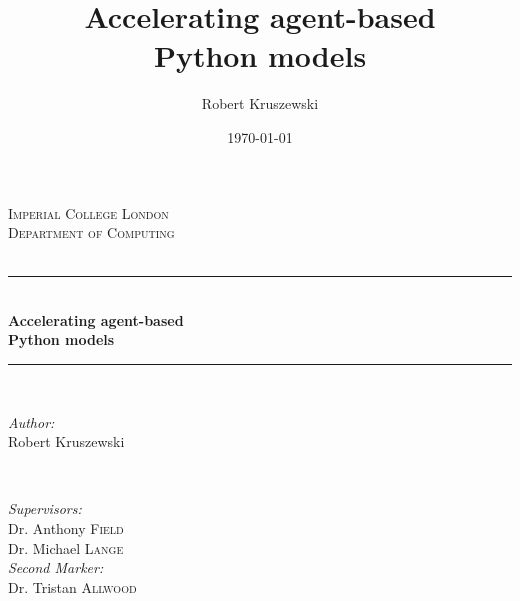 \documentclass[12pt, a4paper]{report}
\title{Accelerating agent-based\\Python models}
\date{\today}
\author{Robert Kruszewski}
\begin{document}
\begin{titlepage}

\newcommand{\HRule}{\rule{\linewidth}{0.5mm}} %

\center %


\textsc{\large Imperial College London}\\[1.5cm] %
\textsc{\large Department of Computing}\\[0.5cm] %
\textsc{\large}\\[0.5cm] %


\HRule \\[0.4cm]
{ \huge \bfseries Accelerating agent-based\\\vspace{0.4cm}Python models}\\[0.4cm] %
\HRule \\[1.5cm]


\begin{minipage}{0.4\textwidth}
\begin{flushleft} \large
\emph{Author:}\\
Robert Kruszewski\\
\end{flushleft}
\end{minipage}
~
\begin{minipage}{0.4\textwidth}
\begin{flushright} \large
\emph{Supervisors:} \\
Dr. Anthony \textsc{Field} \\%
Dr. Michael \textsc{Lange} \\%
\vspace{12pt}
\emph{Second Marker:} \\
Dr. Tristan \textsc{Allwood} \\%
\end{flushright}
\end{minipage}\\[5cm]


\end{titlepage}
\end{document}
